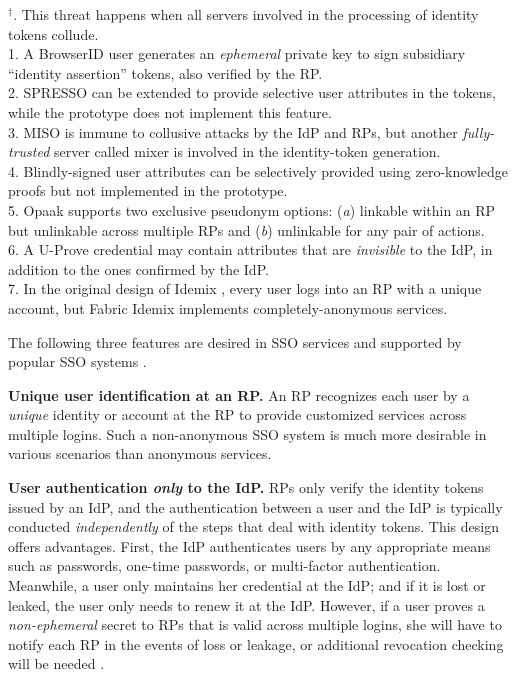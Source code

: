 \begin{table}[tb]
    \label{tbl:comparison-protocol}
\flushleft
{\footnotesize
$^{\dag}$. This threat happens when all servers involved in the processing of identity tokens collude.\\
1. A BrowserID user generates an \emph{ephemeral} private key to sign subsidiary ``identity assertion'' tokens,
also verified by the RP.\\
2. SPRESSO can be extended to provide selective user attributes in the tokens, while the prototype does not implement this feature.\\
3. MISO is immune to collusive attacks by the IdP and RPs, but another \emph{fully-trusted} server called mixer is involved in the identity-token generation.\\
4. Blindly-signed user attributes can be selectively provided using zero-knowledge proofs but not implemented in the prototype.\\
5. Opaak supports two exclusive pseudonym options: (\emph{a}) linkable within an RP but unlinkable across multiple RPs and (\emph{b}) unlinkable for any pair of actions.\\
6. A U-Prove credential may contain attributes that are \emph{invisible} to the IdP, in addition to the ones confirmed by the IdP. \\
7. In the original design of Idemix \cite{idemix}, every user logs into an RP with a unique account, but Fabric Idemix implements completely-anonymous services.}
\end{table}

The following three features are desired in SSO services and supported by popular SSO systems \cite{NIST2017draft, OpenIDConnect,rfc6749, SAML, SAMLIdentifier}.

\noindent \textbf{Unique user identification at an RP.}
An RP recognizes each user by a \emph{unique} identity or account at the RP to provide customized services across multiple logins.
Such a non-anonymous SSO system is much more desirable in various scenarios than anonymous services.

\noindent\textbf{User authentication {\em only} to the IdP.}
RPs only verify the identity tokens issued by an IdP, and the authentication between a user and the IdP is typically conducted \emph{independently} of the steps that deal with identity tokens.
This design offers advantages. First, the IdP authenticates users by any appropriate means such as passwords, one-time passwords, or multi-factor authentication.
Meanwhile, a user only maintains her credential at the IdP; and if it is lost or leaked, the user only needs to renew it at the IdP.
However, if a user proves a \emph{non-ephemeral} secret to RPs that is valid across multiple logins, she will have to notify each RP in the events of loss or leakage, or additional revocation checking will be needed \cite{ELPASSO, UnlimitID}.

